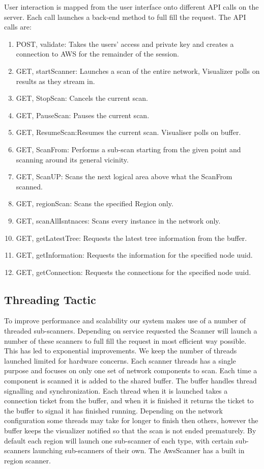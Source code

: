 \documentclass[hidelinks,a4paper,12pt]{article}
\begin{document}
User interaction is mapped from the user interface onto different API calls on the server. Each call launches a back-end method to full fill the request. The API calls are:
\begin{enumerate} 
\item POST, validate: Takes the users' access and private key and creates a connection to AWS for the remainder of the session.
\item GET, startScanner: Launches a scan of the entire network, Visualizer polls on results as they stream in. 
\item GET, StopScan: Cancels the current scan.
\item GET, PauseScan: Pauses the current scan.
\item GET, ResumeScan:Resumes the current scan. Visualiser polls on buffer.
\item GET, ScanFrom: Performs a sub-scan starting from the given point and scanning around its general vicinity.
\item GET, ScanUP: Scans the next logical area above what the ScanFrom scanned.
\item GET, regionScan: Scans the specified Region only.
\item GET, scanAllIsntnaces: Scans every instance in the network only.
\item GET, getLatestTree: Requests the latest tree information from the buffer.
\item GET, getInformation: Requests the information for the specified node uuid.
\item GET, getConnection: Requests the connections for the specified node uuid.
\end{enumerate}

\subsection{Threading Tactic}
To improve performance and scalability our system makes use of a number of threaded sub-scanners. Depending on service requested the Scanner will launch a number of these scanners to full fill the request in most efficient way possible.
This has led to exponential improvements. We keep the number of threads launched limited for hardware concerns. Each scanner threads has a single purpose and focuses on only one set of network components to scan. Each time a component is scanned it is added to the shared buffer. The buffer handles thread signalling and synchronization. Each thread when it is launched takes a connection ticket from the buffer, and when it is finished it returns the ticket to the buffer to signal it has finished running. Depending on the network configuration some threads may take for longer to finish then others, however the buffer keeps the visualizer notified so that the scan is not ended prematurely. By default each region will launch one sub-scanner of each type, with certain sub-scanners launching sub-scanners of their own. 
The AwsScanner has a built in region scanner.
\end{document}
